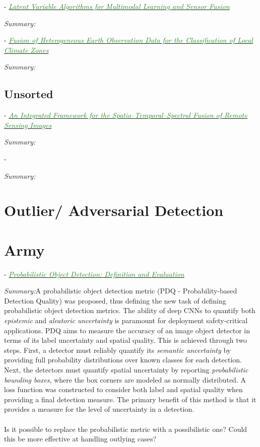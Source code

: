 \documentclass[]{article}
\newcommand{\paperentry}[4]{
            \hangindent=1cm
            \cite{#1} - \href{run:../References/#3}{\textcolor{ForestGreen}{\textit{#2}}}
            
            \noindent            
            \begin{minipage}[t]{0.1\linewidth}\hfill\end{minipage}
            \begin{minipage}[t]{0.8\linewidth}\textcolor{NavyBlue}{{\textit{Summary:}}}#4\end{minipage}
            \vspace{.25cm}
          }
\begin{document}
			
		\paperentry{Guo2019LVAforMultimodalLearningandSensorFusion}
		{Latent Variable Algorithms for Multimodal Learning and Sensor Fusion}
		{Fusion/Guo2019LVAforMultimodalLearningandSensorFusion.pdf}
		{}
		
		\paperentry{Zhang2019FusionHeteroEarthObsClimateZones}
		{Fusion of Heterogeneous Earth Observation Data for the Classification of Local Climate Zones}
		{Fusion/Zhang2019FusionHeteroEarthObsClimateZones.pdf}
		{}
	
	\subsection{Unsorted}
	
	\paperentry{Shen2016SpatioTemporalSpectralFusion}
	{An Integrated Framework for the Spatio–Temporal–Spectral Fusion of Remote Sensing Images}
	{Fusion/Shen2016SpatioTemporalSpectralFusion.pdf}
	{}
	
	
	\paperentry{}
	{}
	{}
	{}
	
	


\section{Outlier/ Adversarial Detection}

\section{Army}

\paperentry{Hall2019ProbabilisticObjectDetection}
{Probabilistic Object Detection: Definition and Evaluation}
{Army/Hall2019ProbabilisticObjectDetection.pdf}
{A probabilistic object detection metric (PDQ - Probability-based Detection Quality) was proposed, thus defining the new task of defining probabilistic object detection metrics.  The ability of deep CNNs to quantify both \textit{epistemic} and \textit{aleatoric uncertainty} is paramount for deployment safety-critical applications.  PDQ aims to measure the accuracy of an image object detector in terms of its label uncertainty and spatial quality.  This is achieved through two steps.  First, a detector must reliably quantify its \textit{semantic uncertainty} by providing full probability distributions over known classes for each detection.  Next, the detectors must quantify spatial uncertainty by reporting \textit{probabilistic bounding boxes}, where the box corners are modeled as normally distributed.  A loss function was constructed to consider both label and spatial quality when providing a final detection measure.  The primary benefit of this method is that it provides a measure for the level of uncertainty in a detection. \\ \\ Is it possible to replace the probabilistic metric with a possibilistic one?  Could this be more effective at handling outlying cases?} 
\end{document}
